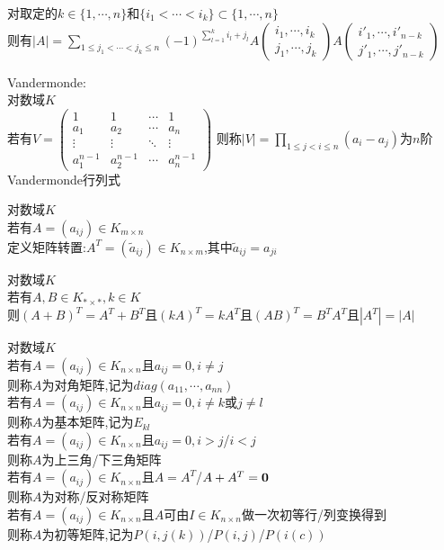 \begin{dingli}
对取定的$k\in\{1,\cdots,n\}$和$\{i_1<\cdots<i_k\}\subset\{1,\cdots,n\}$\\
则有$|A|=\sum\limits_{1\leq j_1<\cdots<j_k\leq n}(-1)^{\sum\limits_{l=1}^{k}i_l+j_l}A\begin{pmatrix}i_1,\cdots,i_k\\ j_1,\cdots,j_k\end{pmatrix}A\begin{pmatrix}i'_1,\cdots,i'_{n-k}\\ j'_1,\cdots,j'_{n-k}\end{pmatrix}$
\end{dingli}

\begin{dingli}
Vandermonde:\\
对数域$K$\\
若有$V=\begin{pmatrix} 1 & 1 & \cdots & 1 \\ a_1 & a_2 & \cdots & a_n \\ \vdots & \vdots & \ddots & \vdots \\ a_1^{n-1} & a_2^{n-1} & \cdots & a_n^{n-1} \end{pmatrix}$
\mbox{则称$|V|=\prod\limits_{1\leq j<i\leq n}(a_i-a_j)$为$n$阶Vandermonde行列式}
\end{dingli}

\begin{dingyi}
对数域$K$\\
若有$A=(a_{ij})\in K_{m\times n}$\\
定义矩阵转置:$A^{T}=(\widetilde{a}_{ij})\in K_{n\times m}$,其中$\widetilde{a}_{ij}=a_{ji}$
\end{dingyi}

\begin{dingli}
对数域$K$\\
若有$A,B\in K_{*\times *},k\in K$\\
则$(A+B)^{T}=A^{T}+B^{T}$且$(kA)^{T}=kA^{T}$且$(AB)^{T}=B^{T}A^{T}$且$|A^{T}|=|A|$
\end{dingli}

\begin{dingyi}
对数域$K$\\
若有$A=(a_{ij})\in K_{n\times n}$且$a_{ij}=0,i\neq j$\\
则称$A$为对角矩阵,记为$diag(a_{11},\cdots,a_{nn})$\\
若有$A=(a_{ij})\in K_{n\times n}$且$a_{ij}=0,i\neq k$或$j\neq l$\\
则称$A$为基本矩阵,记为$E_{kl}$\\
若有$A=(a_{ij})\in K_{n\times n}$且$a_{ij}=0,i>j$/$i<j$\\
则称$A$为上三角/下三角矩阵\\
若有$A=(a_{ij})\in K_{n\times n}$且$A=A^{T}$/$A+A^{T}={\bf0}$\\
则称$A$为对称/反对称矩阵\\
若有$A=(a_{ij})\in K_{n\times n}$且$A$可由$I\in K_{n\times n}$做一次初等行/列变换得到\\
则称$A$为初等矩阵,记为$P(i,j(k))$/$P(i,j)$/$P(i(c))$
\end{dingyi}

